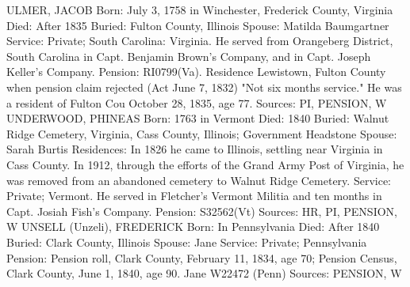 ULMER, JACOB 
Born: July 3, 1758 in Winchester, Frederick County, Virginia 
Died: After 1835 
Buried: Fulton County, Illinois 
Spouse: Matilda Baumgartner 
Service: Private; South Carolina: Virginia. He served from Orangeberg District, South Carolina in Capt. Benjamin Brown's Company, and in Capt. Joseph Keller's Company. 
Pension: RI0799(Va). Residence Lewistown, Fulton County when pension claim rejected (Act June 7, 1832) "Not six months service." He was a resident of Fulton Cou \nty October 28, 1835, age 77. 
Sources: PI, PENSION, W 
UNDERWOOD, PHINEAS 
Born: 1763 in Vermont 
Died: 1840 
Buried: Walnut Ridge Cemetery, Virginia, Cass County, Illinois; Government Headstone Spouse: Sarah Burtis 
Residences: In 1826 he came to Illinois, settling near Virginia in Cass County. In 1912, through the efforts of the Grand Army Post of Virginia, he was re­moved from an abandoned cemetery to Walnut Ridge Cemetery. 
Service: Private; Vermont. He served in Fletcher's Vermont Militia and ten months in Capt. Josiah Fish's Company. 
Pension: S32562(Vt) 
Sources: HR, PI, PENSION, W 
UNSELL (Unzeli), FREDERICK 
Born: In Pennsylvania 
Died: After 1840 
Buried: Clark County, Illinois 
Spouse: Jane 
Service: Private; Pennsylvania
Pension: Pension roll, Clark County, February 11, 1834, age 70; Pension Census, Clark County,  June 1, 1840, age 90. Jane W22472 (Penn) 
Sources: PENSION, W 

